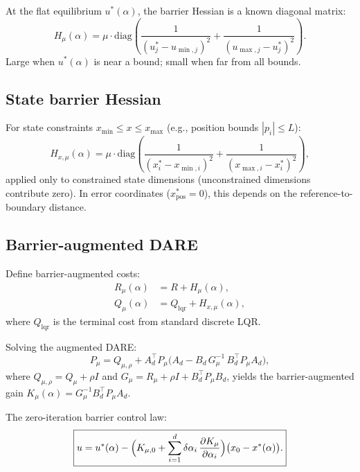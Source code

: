 \documentclass[11pt]{article}
\newcommand{\diag}{\mathrm{diag}}
\begin{document}
At the flat equilibrium $u^*(\alpha)$, the barrier
Hessian is a known diagonal matrix:
\begin{equation}\label{eq:barrier_hess}
  H_\mu(\alpha) = \mu \cdot \diag\!\left(
    \frac{1}{(u^*_j - u_{\min,j})^2}
    + \frac{1}{(u_{\max,j} - u^*_j)^2}
  \right).
\end{equation}
Large when $u^*(\alpha)$ is near a bound;
small when far from all bounds.

\subsection{State barrier Hessian}

For state constraints $x_{\min} \le x \le x_{\max}$
(e.g., position bounds $|p_i| \le L$):
\begin{equation}\label{eq:barrier_hess_x}
  H_{x,\mu}(\alpha) = \mu \cdot \diag\!\left(
    \frac{1}{(x^*_i - x_{\min,i})^2}
    + \frac{1}{(x_{\max,i} - x^*_i)^2}
  \right),
\end{equation}
applied only to constrained state dimensions
(unconstrained dimensions contribute zero).
In error coordinates ($x^*_{\mathrm{pos}} = 0$),
this depends on the reference-to-boundary distance.

\subsection{Barrier-augmented DARE}

Define barrier-augmented costs:
\begin{align}
  R_\mu(\alpha) &= R + H_\mu(\alpha), \label{eq:R_barrier} \\
  Q_\mu(\alpha) &= Q_{\mathrm{lqr}} + H_{x,\mu}(\alpha), \label{eq:Q_barrier}
\end{align}
where $Q_{\mathrm{lqr}}$ is the terminal cost from
standard discrete LQR.

Solving the augmented DARE:
\begin{equation}\label{eq:dare_barrier}
  P_\mu = Q_{\mu,\rho} + A_d^\top P_\mu \bigl(
    A_d - B_d \, G_\mu^{-1} \,
    B_d^\top P_\mu A_d \bigr),
\end{equation}
where $Q_{\mu,\rho} = Q_\mu + \rho I$ and
$G_\mu = R_\mu + \rho I + B_d^\top P_\mu B_d$,
yields the barrier-augmented gain
$K_\mu(\alpha) = G_\mu^{-1} B_d^\top P_\mu A_d$.

The zero-iteration barrier control law:
\begin{equation}\label{eq:barrier_control}
\boxed{
  u = u^*(\alpha)
  - \Bigl(K_{\mu,0} + \sum_{i=1}^{d}
    \delta\alpha_i\, \frac{\partial K_\mu}{\partial \alpha_i}\Bigr)
  \bigl(x_0 - x^*(\alpha)\bigr).
}
\end{equation}
\end{document}
